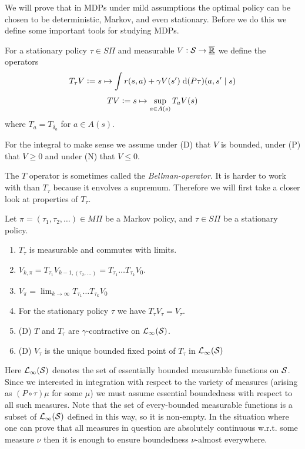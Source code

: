 We will prove that in MDPs under mild assumptions the optimal policy
can be chosen to be deterministic, Markov, and even stationary.
Before we do this we define some important tools for studying MDPs.

\begin{defn}
  For a stationary policy $\tau \in S\Pi$ and measurable $V:\mathcal{S} \to \overline{\underline{\mathbb{R}}}$
  we define the operators 
  \[ T_\tau V \vcentcolon= s \mapsto \int r(s, a)
  + \gamma V(s') \; \mathrm{d} (P \tau)(a, s'\mid s) \]
  \[ T V \vcentcolon= s \mapsto \sup_{a \in A(s)} T_a V(s) \]
  where $T_a = T_{\delta_a}$ for $a \in A(s)$.
\end{defn}
\begin{rem}
  For the integral to make sense we assume under (D) that $V$ is bounded,
  under (P) that $V\geq 0$ and under (N) that $V \leq 0$.
\end{rem}

The $T$ operator is sometimes called the \emph{Bellman-operator}. %
It is harder to work with than $T_\tau$ because it envolves a supremum.
Therefore we will first take a closer look at properties of $T_\tau$.

\begin{prop}
  Let $\pi = (\tau_1, \tau_2, \dots) \in M\Pi$ be a Markov policy,
  and $\tau \in S\Pi$ be a stationary policy.
  \begin{enumerate}
    \item $T_\tau$ is measurable and commutes with limits.
    \item $V_{k, \pi} = T_{\tau_1} V_{k-1, (\tau_2, \dots)}
      = T_{\tau_1} \dots T_{\tau_k} V_0$.
    \item $V_\pi = \lim_{k \to \infty} T_{\tau_1} \dots T_{\tau_k} V_0$
    \item For the stationary policy $\tau$ we have $T_\tau V_\tau = V_\tau$.
    \item (D) $T$ and $T_\tau$ are $\gamma$-contractive
      on $\mathcal{L}_\infty(\mathcal{S})$.
    \item (D) $V_\tau$ is the unique bounded fixed point of $T_\tau$
      in $\mathcal{L}_\infty(\mathcal{S})$
  \end{enumerate} 
  \label{prop:propTpiV}
\end{prop}

\begin{rem}
  Here $\mathcal{L}_\infty(\mathcal{S})$ denotes the set of essentially bounded
  measurable functions on $\mathcal{S}$. Since we interested in integration
  with respect to the variety of measures
  (arising as $(P \circ \tau) \mu$ for some $\mu$)
  we must assume essential boundedness with respect to
  all such measures. Note that the set of every-bounded measurable functions
  is a subset of $\mathcal{L}_\infty(\mathcal{S})$ defined in this way, so it is
  non-empty.
  In the situation where one can prove that all
  measures in question are absolutely continuous w.r.t. some measure
  $\nu$ then it is enough to ensure boundedness $\nu$-almost everywhere.
\end{rem}

